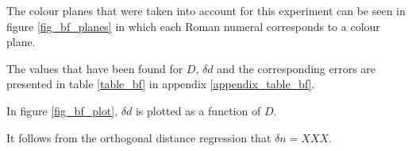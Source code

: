 The colour planes that were taken into account for this experiment can be seen in figure \ref{fig_bf_planes} in which each Roman numeral corresponds to a colour plane. 


The values that have been found for $D$, $\delta d$ and the corresponding errors are presented in table \ref{table_bf} in appendix \ref{appendix_table_bf}.

In figure \ref{fig_bf_plot}, $\delta d$ is plotted as a function of $D$. 


It follows from the orthogonal distance regression that $\delta n = XXX$. 







